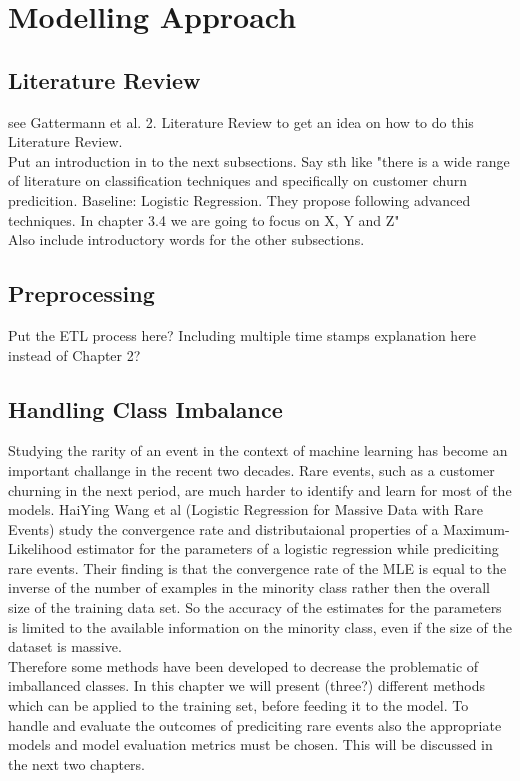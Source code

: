 \documentclass[12pt,titlepage]{article}
\begin{document}
\section{Modelling Approach} \par

\subsection{Literature Review} \par

see Gattermann et al. 2. Literature Review to get an idea on how to do this Literature Review. \\
Put an introduction in to the next subsections. Say sth like "there is a wide range of literature on classification techniques and specifically on customer churn predicition.
Baseline: Logistic Regression. They propose following advanced techniques. In chapter 3.4 we are going to focus on X, Y and Z" \\
Also include introductory words for the other subsections. \\

\subsection{Preprocessing} \par

Put the ETL process here? Including multiple time stamps explanation here instead of Chapter 2? \\

\subsection{Handling Class Imbalance} \par

Studying the rarity of an event in the context of machine learning has become an important challange in the recent two decades. Rare events, such as a customer churning in the
next period, are much harder to identify and learn for most of the models. HaiYing Wang et al (Logistic Regression for Massive Data with Rare Events) study the convergence rate
and distributaional properties of a Maximum-Likelihood estimator for the parameters of a logistic regression while prediciting rare events. Their finding is that the convergence
rate of the MLE is equal to the inverse of the number of examples in the minority class rather then the overall size of the training data set. So the accuracy of the estimates for
the parameters is limited to the available information on the minority class, even if the size of the dataset is massive. \\
Therefore some methods have been developed to decrease the problematic of imballanced classes. In
this chapter we will present (three?) different methods which can be applied to the training set, before feeding it to the model. To handle and evaluate the outcomes
of prediciting rare events also the appropriate models and model evaluation metrics must be chosen. This will be discussed in the next two chapters. \\
\end{document}
